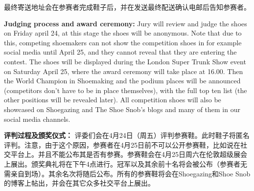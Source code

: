\begin{paracol}{2}
        \vspace{1em}

        \switchcolumn
        最终寄送地址会在参赛者完成鞋子后，并在发送最终配送确认电邮后告知参赛者。
        \switchcolumn*

        \textbf{Judging process and award ceremony:}
        Jury will review and judge the shoes on Friday april 24, at this stage the shoes will be anonymous. Note that due to this, competing shoemakers can not show the competition shoes in for example social media until April 25, and they cannot reveal that they are entering the contest. The shoes will be displayed during the London Super Trunk Show event on Saturday April 25, where the award ceremony will take place at 16.00. Then the World Champion in Shoemaking and the podium places will be announced (competitors don't have to be in place themselves), with the full top ten list (the other positions will be revealed later). All competition shoes will also be showcased on Shoegazing and The Shoe Snob’s blogs and many of them in our social media channels.

        \vspace{1em}

        \switchcolumn
        \textbf{评判过程及颁奖仪式：}
        评委们会在4月24日（周五）评判参赛鞋。此时鞋子将匿名评判。注意，由于这个原因，参赛者在4月25日前不可以公开参赛鞋，比如说在社交平台上。并且不能公布其是否有参赛。参赛鞋会在4月25日周六在伦敦超级展会上展出。颁奖典礼将在下午4点进行。冠军以及其余前十名将会被公布（参赛者无需亲自到场）。其余名次将随后公布。所有的参赛鞋将会在Shoegazing和Shoe Snob的博客上帖出，并会在其它众多社交平台上展出。
        \switchcolumn*


\end{paracol}
